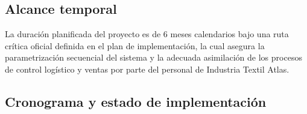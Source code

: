 \subsection{Alcance temporal}
\begin{indentedsubsection}
La duración planificada del proyecto es de 6 meses calendarios bajo una ruta crítica oficial definida en el plan de implementación, la cual asegura la parametrización secuencial del sistema y la adecuada asimilación de los procesos de control logístico y ventas por parte del personal de Industria Textil Atlas.
\end{indentedsubsection}

\subsection{Cronograma y estado de implementación}

